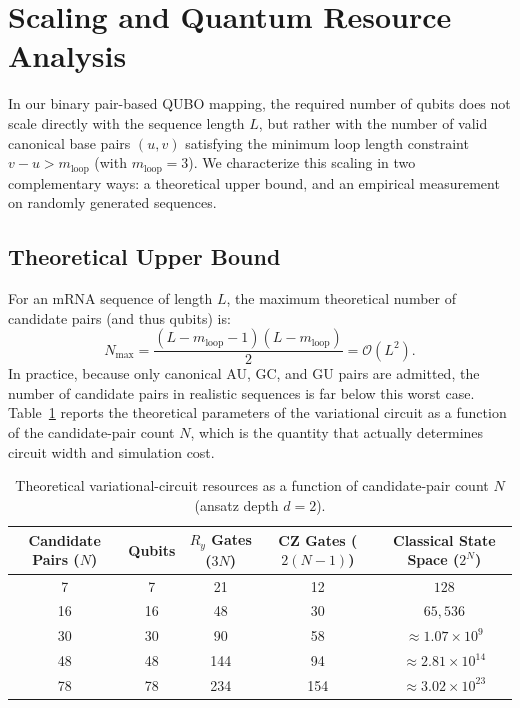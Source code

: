 \documentclass[11pt,a4paper]{article}
\begin{document}
	\clearpage
	
	\section{Scaling and Quantum Resource Analysis}
	\label{sec:scaling}
	
	In our binary pair-based QUBO mapping, the required number of qubits does not scale directly with the sequence length $L$, but rather with the number of valid canonical base pairs $(u, v)$ satisfying the minimum loop length constraint $v - u > m_{\text{loop}}$ (with $m_{\text{loop}} = 3$). We characterize this scaling in two complementary ways: a theoretical upper bound, and an empirical measurement on randomly generated sequences.
	
	\subsection{Theoretical Upper Bound}
	
	For an mRNA sequence of length $L$, the maximum theoretical number of candidate pairs (and thus qubits) is:
	\begin{equation}
		N_{\text{max}} = \frac{(L - m_{\text{loop}} - 1)(L - m_{\text{loop}})}{2} = \mathcal{O}(L^2).
	\end{equation}
	In practice, because only canonical AU, GC, and GU pairs are admitted, the number of candidate pairs in realistic sequences is far below this worst case. Table~\ref{tab:qubit_scaling_theory} reports the theoretical parameters of the variational circuit as a function of the candidate-pair count $N$, which is the quantity that actually determines circuit width and simulation cost.
	
	\begin{table}[htbp]
		\centering
		\caption{Theoretical variational-circuit resources as a function of candidate-pair count $N$ (ansatz depth $d=2$).}
		\label{tab:qubit_scaling_theory}
		\small
		\begin{tabular}{ccccc}
			\hline
			\textbf{Candidate Pairs ($N$)} & \textbf{Qubits} & \textbf{$R_y$ Gates ($3N$)} & \textbf{CZ Gates ($2(N{-}1)$)} & \textbf{Classical State Space ($2^N$)} \\
			\hline
			7   & 7   & 21  & 12  & $128$ \\
			16  & 16  & 48  & 30  & $65{,}536$ \\
			30  & 30  & 90  & 58  & $\approx 1.07 \times 10^{9}$ \\
			48  & 48  & 144 & 94  & $\approx 2.81 \times 10^{14}$ \\
			78  & 78  & 234 & 154 & $\approx 3.02 \times 10^{23}$ \\
			\hline
		\end{tabular}
	\end{table}
	
\end{document}
